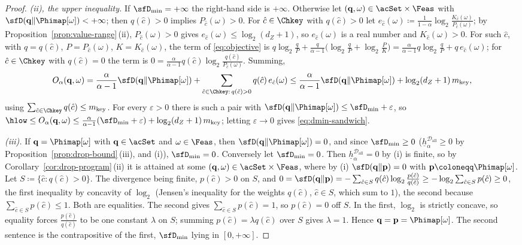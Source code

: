 \begin{proof}
\emph{(ii), the upper inequality.} If $\sfD_{\min}=+\infty$ the right-hand
side is $+\infty$. Otherwise let $(\mathbf q,\omega)\in\acSet\times\Feas$ with
$\sfD(\mathbf q\|\Phimap[\omega])<+\infty$; then $q(\hat c)>0$ implies
$P_{\hat c}(\omega)>0$. For $\hat c\in\Chkey$ with $q(\hat c)>0$ let
$e_{\hat c}(\omega)\coloneqq\frac{1}{1-\alpha}\log_2
\frac{K_{\hat c}(\omega)}{P_{\hat c}(\omega)}$; by
Proposition~\ref{prop:value-range}\,(ii), $P_{\hat c}(\omega)>0$ gives
$e_{\hat c}(\omega)\le\log_2(d_Z+1)$, so $e_{\hat c}(\omega)$ is a real
number and $K_{\hat c}(\omega)>0$. For such $\hat c$, with $q=q(\hat c)$,
$P=P_{\hat c}(\omega)$, $K=K_{\hat c}(\omega)$, the term of
\eqref{eq:objective} is
$q\log_2\frac qP+\frac{q}{\alpha-1}\big(\log_2\frac qP+\log_2\frac PK\big)
=\frac{\alpha}{\alpha-1}q\log_2\frac qP+q\,e_{\hat c}(\omega)$; for
$\hat c\in\Chkey$ with $q(\hat c)=0$ the term is $0
=\frac{\alpha}{\alpha-1}q(\hat c)\log_2\frac{q(\hat c)}{P_{\hat c}(\omega)}$.
Summing,
\begin{equation*}
  O_{\alpha}(\mathbf q,\omega)
  =\frac{\alpha}{\alpha-1}\sfD(\mathbf q\|\Phimap[\omega])
  +\sum_{\hat c\in\Chkey:\,q(\hat c)>0}q(\hat c)\,e_{\hat c}(\omega)
  \le\frac{\alpha}{\alpha-1}\sfD(\mathbf q\|\Phimap[\omega])
  +\log_2(d_Z+1)\,m_{\mathrm{key}} ,
\end{equation*}
using $\sum_{\hat c\in\Chkey}q(\hat c)\le m_{\mathrm{key}}$. For every
$\varepsilon>0$ there is such a pair with
$\sfD(\mathbf q\|\Phimap[\omega])\le\sfD_{\min}+\varepsilon$, so
$\hlow\le O_{\alpha}(\mathbf q,\omega)\le\frac{\alpha}{\alpha-1}
(\sfD_{\min}+\varepsilon)+\log_2(d_Z+1)\,m_{\mathrm{key}}$; letting
$\varepsilon\to0$ gives \eqref{eq:dmin-sandwich}.

\emph{(iii).} If $\mathbf q=\Phimap[\omega]$ with $\mathbf q\in\acSet$ and
$\omega\in\Feas$, then $\sfD(\mathbf q\|\Phimap[\omega])=0$, and since
$\sfD_{\min}\ge0$ ($\underline{h}^{\mathcal{D}_{\mathrm{all}}}_{\alpha}\ge0$ by
Proposition~\ref{prop:drop-bound}\,(iii), and (i)), $\sfD_{\min}=0$.
Conversely let $\sfD_{\min}=0$. Then
$\underline{h}^{\mathcal{D}_{\mathrm{all}}}_{\alpha}=0$ by (i) is finite, so by
Corollary~\ref{cor:drop-program}\,(ii) it is attained at some
$(\mathbf q,\omega)\in\acSet\times\Feas$, where by (i)
$\sfD(\mathbf q\|\mathbf p)=0$ with $\mathbf p\coloneqq\Phimap[\omega]$. Let
$S\coloneqq\{\hat c:q(\hat c)>0\}$. The divergence being finite,
$p(\hat c)>0$ on $S$, and
$0=\sfD(\mathbf q\|\mathbf p)=-\sum_{\hat c\in S}q(\hat c)\log_2
\frac{p(\hat c)}{q(\hat c)}\ge-\log_2\sum_{\hat c\in S}p(\hat c)\ge0$, the
first inequality by concavity of $\log_2$ (Jensen's inequality for the
weights $q(\hat c)$, $\hat c\in S$, which sum to $1$), the second because
$\sum_{\hat c\in S}p(\hat c)\le1$. Both are equalities. The second gives
$\sum_{\hat c\in S}p(\hat c)=1$, so $p(\hat c)=0$ off $S$. In the first,
$\log_2$ is strictly concave, so equality forces
$\frac{p(\hat c)}{q(\hat c)}$ to be one constant $\lambda$ on $S$; summing
$p(\hat c)=\lambda q(\hat c)$ over $S$ gives $\lambda=1$. Hence
$\mathbf q=\mathbf p=\Phimap[\omega]$. The second sentence is the
contrapositive of the first, $\sfD_{\min}$ lying in $[0,+\infty]$.


\end{proof}
